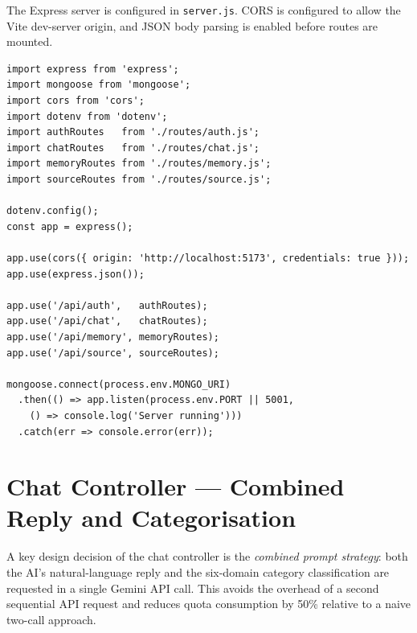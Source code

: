 \documentclass[12pt,a4paper]{report}
\begin{document}
The Express server is configured in \texttt{server.js}. CORS is configured to allow the Vite dev-server origin, and JSON body parsing is enabled before routes are mounted.

\begin{lstlisting}[caption={server.js — Middleware and Route Mounting}]
import express from 'express';
import mongoose from 'mongoose';
import cors from 'cors';
import dotenv from 'dotenv';
import authRoutes   from './routes/auth.js';
import chatRoutes   from './routes/chat.js';
import memoryRoutes from './routes/memory.js';
import sourceRoutes from './routes/source.js';

dotenv.config();
const app = express();

app.use(cors({ origin: 'http://localhost:5173', credentials: true }));
app.use(express.json());

app.use('/api/auth',   authRoutes);
app.use('/api/chat',   chatRoutes);
app.use('/api/memory', memoryRoutes);
app.use('/api/source', sourceRoutes);

mongoose.connect(process.env.MONGO_URI)
  .then(() => app.listen(process.env.PORT || 5001,
    () => console.log('Server running')))
  .catch(err => console.error(err));
\end{lstlisting}

\section{Chat Controller — Combined Reply and Categorisation}

\label{sec:chat}
A key design decision of the chat controller is the \textit{combined prompt strategy}: both the AI's natural-language reply and the six-domain category classification are requested in a single Gemini API call. This avoids the overhead of a second sequential API request and reduces quota consumption by 50\% relative to a naive two-call approach.
\end{document}

